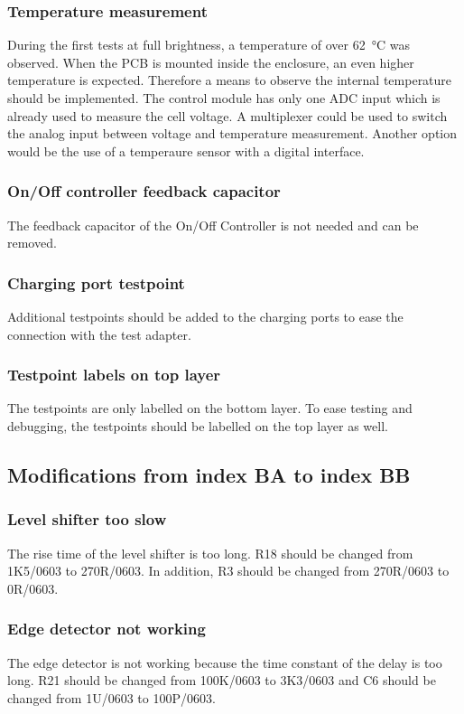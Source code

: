 \subsubsection{Temperature measurement}
During the first tests at full brightness, a temperature of over \qty{62}{\celsius} was observed. When the \ac{PCB} is mounted inside the enclosure, an even higher temperature is expected. Therefore a means to observe the internal temperature should be implemented. The control module has only one \ac{ADC} input which is already used to measure the cell voltage. A multiplexer could be used to switch the analog input between voltage and temperature measurement. Another option would be the use of a temperaure sensor with a digital interface. 

\subsubsection{On/Off controller feedback capacitor}
The feedback capacitor of the On/Off Controller is not needed and can be removed. 

\subsubsection{Charging port testpoint}
Additional testpoints should be added to the charging ports to ease the connection with the test adapter. 

\subsubsection{Testpoint labels on top layer}
The testpoints are only labelled on the bottom layer. To ease testing and debugging, the testpoints should be labelled on the top layer as well. 

\subsection{Modifications from index BA to index BB}

\subsubsection{Level shifter too slow}
The rise time of the level shifter is too long. R18 should be changed from 1K5/0603 to 270R/0603. In addition, R3 should be changed from 270R/0603 to 0R/0603. 

\subsubsection{Edge detector not working}
The edge detector is not working because the time constant of the delay is too long. R21 should be changed from 100K/0603 to 3K3/0603 and C6 should be changed from 1U/0603 to 100P/0603. 

